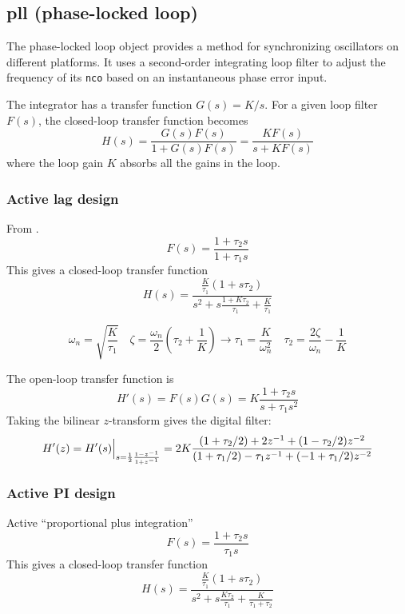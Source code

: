 \subsection{{pll} (phase-locked loop)}
\label{module:nco:pll}
The phase-locked loop object provides a method for synchronizing oscillators
on different platforms.
It uses a second-order integrating loop filter to adjust the frequency of its
{\tt nco} based on an instantaneous phase error input.

The integrator has a transfer function $G(s) = K/s$.
For a given loop filter $F(s)$, the closed-loop transfer function becomes
\[
    H(s) = \frac{ G(s)F(s) }{ 1 + G(s)F(s) }
         = \frac{ KF(s)    }{ s + KF(s)    }
\]
where the loop gain $K$ absorbs all the gains in the loop.

\subsubsection{Active lag design}
From \cite{Best:1997}.
\[
    F(s) = \frac{1 + \tau_2 s}{1 + \tau_1 s}
\]
This gives a closed-loop transfer function
\[
    H(s) = \frac{
                \frac{K}{\tau_1} (1 + s\tau_2)
           } {
                s^2 + s\frac{1 + K\tau_2}{\tau_1} + \frac{K}{\tau_1}
           }
\]

\[
    \omega_n = \sqrt{\frac{K}{\tau_1}}
    \,\,\,\,\,\,
    \zeta = \frac{\omega_n}{2}\left(\tau_2 + \frac{1}{K}\right)
        \rightarrow
    \tau_1 = \frac{K}{\omega_n^2}
    \,\,\,\,\,\,
    \tau_2 = \frac{2\zeta}{\omega_n} - \frac{1}{K}
\]

The open-loop transfer function is
\[
    H'(s) = F(s)G(s) = K \frac{1 + \tau_2 s}{s + \tau_1 s^2}
\]
Taking the bilinear $z$-transform gives the digital filter:
\[
    H'(z) = H'(s)\Bigl.\Bigr|_{s = \frac{1}{2}\frac{1-z^{-1}}{1+z^{-1}}}
          = 2 K \frac{
                (1+\tau_2/2) + 2 z^{-1}     + ( 1 - \tau_2/2)z^{-2}
          } {
                (1+\tau_1/2) -\tau_1 z^{-1} + (-1 + \tau_1/2)z^{-2}
          }
\]



\subsubsection{Active PI design}
Active ``proportional plus integration''
\[
    F(s) = \frac{1 + \tau_2 s}{\tau_1 s}
\]
This gives a closed-loop transfer function
\[
    H(s) = \frac{
                \frac{K}{\tau_1} (1 + s\tau_2)
           } {
                s^2 + s\frac{K\tau_2}{\tau_1} + \frac{K}{\tau_1 + \tau_2}
           }
\]

